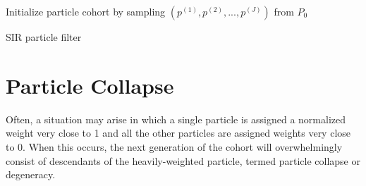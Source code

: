     \begin{algorithm}

        \BlankLine

        \DontPrintSemicolon


        \BlankLine

        Initialize particle cohort by sampling $(p^{(1)}, p^{(2)}, ..., p^{(J)})$ from $P_0$

        \BlankLine


        \BlankLine


        \BlankLine

        \caption{SIR particle filter \label{pfsir}}

    \end{algorithm}

\section{Particle Collapse}

	Often, a situation may arise in which a single particle is assigned a normalized weight very close to 1 and all the other particles are assigned weights very close to 0. When this occurs, the next generation of the cohort will overwhelmingly consist of descendants of the heavily-weighted particle, termed particle collapse or degeneracy.

